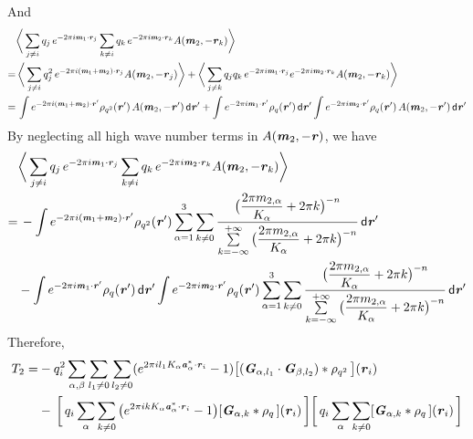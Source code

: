 \documentclass[aps,pre,preprint]{revtex4}
\renewcommand{\v}[1]{\textbf{\textit{#1}}}
\renewcommand{\d}[1]{\textsf{#1}}
\begin{document}
And 
\begin{align} \nonumber
  & \bigg\langle
  \sum_{j\neq i}q_j\,e^{-2\pi i\v m_1\cdot\v r_j}  
  \sum_{k\neq i}q_k\,e^{-2\pi i\v m_2\cdot\v r_k}A(\v m_2, -\v r_k)
  \bigg\rangle \\ \nonumber
  = &\,
  \bigg\langle
  \sum_{j\neq i}q^2_j\,e^{-2\pi i(\v m_1+\v m_2)\cdot\v r_j}A(\v m_2, -\v r_j) 
  \bigg\rangle
  +
  \bigg\langle
  \sum_{j\neq k}q_jq_k\,
  e^{-2\pi i\v m_1\cdot\v r_j}  
  e^{-2\pi i\v m_2\cdot\v r_k}A(\v m_2, -\v r_k)
  \bigg\rangle \\ \nonumber
  = &\,
  \int
  e^{-2\pi i (\v m_1 + \v m_2)\cdot\v r'}\rho_{q^2}(\v r')\,A(\v m_2,-\v r')\,\d d\v r' +
  \int
  e^{-2\pi i\v m_1\cdot\v r'}\rho_q(\v r')\,\d d\v r'
  \int
  e^{-2\pi i\v m_2\cdot\v r'}\rho_q(\v r')\,A(\v m_2,-\v r') \,\d d\v r'  
\end{align}
By neglecting all high wave number terms in $A(\v m_2,-\v r)$, we have
\begin{align}\nonumber
  & \bigg\langle
  \sum_{j\neq i}q_j\,e^{-2\pi i\v m_1\cdot\v r_j}  
  \sum_{k\neq i}q_k\,e^{-2\pi i\v m_2\cdot\v r_k}A(\v m_2, -\v r_k)
  \bigg\rangle \\ \nonumber
  = &\,
  -\int
  e^{-2\pi i (\v m_1 + \v m_2)\cdot\v r'}\rho_{q^2}(\v r')
  \sum_{\alpha=1}^3\sum_{k\neq 0}
  \frac
  {\big(\dfrac{2\pi m_{2,\alpha}}{K_\alpha} + 2\pi k\big)^{-n}}
  {\sum\limits_{k=-\infty}^{+\infty}
    \big(\dfrac{2\pi m_{2,\alpha}}{K_\alpha} + 2\pi k\big)^{-n}}
  \,\d d\v r' \\\nonumber
  &-
  \int
  e^{-2\pi i\v m_1\cdot\v r'}\rho_q(\v r')\,\d d\v r'
  \int
  e^{-2\pi i\v m_2\cdot\v r'}\rho_q(\v r')
  \sum_{\alpha=1}^3\sum_{k\neq 0}
  \frac
  {\big(\dfrac{2\pi m_{2,\alpha}}{K_\alpha} + 2\pi k\big)^{-n}}
  {\sum\limits_{k=-\infty}^{+\infty}
    \big(\dfrac{2\pi m_{2,\alpha}}{K_\alpha} + 2\pi k\big)^{-n}}
  \,\d d\v r'  
\end{align}
Therefore,
\begin{align}\nonumber
  T_2
  = &
  -q_i^2
  \sum_{\alpha,\beta} \sum_{l_1\neq 0}\sum_{l_2\neq 0}
  (e^{2\pi i l_1K_\alpha\v a^\ast_\alpha\cdot\v r_i} - 1)
  \big[
  (\v G_{\alpha,l_1}\cdot\v G_{\beta,l_2})\ast \rho_{q^2}\,
  \big] (\v r_i) \\
  &- \,
  \bigg[\,
  q_i \sum_{\alpha}\sum_{k\neq 0}
  \big(
  e^{2\pi ikK_\alpha\v a_\alpha^\ast\cdot\v r_i} - 1
  \big)
  [\v G_{\alpha,k}\ast\rho_q\,] (\v r_i)
  \,\bigg]  
  \bigg[\,
  q_i \sum_{\alpha}\sum_{k\neq 0}
  [\v G_{\alpha,k}\ast\rho_q\,] (\v r_i)
  \,\bigg]  
\end{align}
\end{document}
